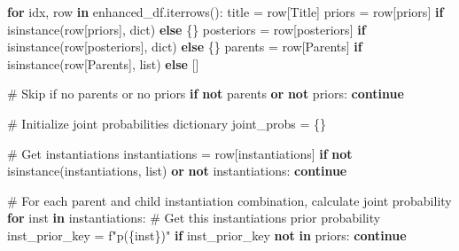 \documentclass[
  11pt,
  letterpaper,
]{book}
\newenvironment{Shaded}{\begin{snugshade}}{\end{snugshade}}
\newcommand{\BuiltInTok}[1]{\textcolor[rgb]{0.00,0.23,0.31}{#1}}
\newcommand{\CommentTok}[1]{\textcolor[rgb]{0.37,0.37,0.37}{#1}}
\newcommand{\ControlFlowTok}[1]{\textcolor[rgb]{0.00,0.23,0.31}{\textbf{#1}}}
\newcommand{\KeywordTok}[1]{\textcolor[rgb]{0.00,0.23,0.31}{\textbf{#1}}}
\newcommand{\NormalTok}[1]{\textcolor[rgb]{0.00,0.23,0.31}{#1}}
\newcommand{\OperatorTok}[1]{\textcolor[rgb]{0.37,0.37,0.37}{#1}}
\newcommand{\SpecialCharTok}[1]{\textcolor[rgb]{0.37,0.37,0.37}{#1}}
\newcommand{\SpecialStringTok}[1]{\textcolor[rgb]{0.13,0.47,0.30}{#1}}
\newcommand{\StringTok}[1]{\textcolor[rgb]{0.13,0.47,0.30}{#1}}
\begin{document}
\begin{Shaded}
\begin{Highlighting}[]
    \ControlFlowTok{for}\NormalTok{ idx, row }\KeywordTok{in}\NormalTok{ enhanced\_df.iterrows():}
\NormalTok{        title }\OperatorTok{=}\NormalTok{ row[}\StringTok{\textquotesingle{}Title\textquotesingle{}}\NormalTok{]}
\NormalTok{        priors }\OperatorTok{=}\NormalTok{ row[}\StringTok{\textquotesingle{}priors\textquotesingle{}}\NormalTok{] }\ControlFlowTok{if} \BuiltInTok{isinstance}\NormalTok{(row[}\StringTok{\textquotesingle{}priors\textquotesingle{}}\NormalTok{], }\BuiltInTok{dict}\NormalTok{) }\ControlFlowTok{else}\NormalTok{ \{\}}
\NormalTok{        posteriors }\OperatorTok{=}\NormalTok{ row[}\StringTok{\textquotesingle{}posteriors\textquotesingle{}}\NormalTok{] }\ControlFlowTok{if} \BuiltInTok{isinstance}\NormalTok{(row[}\StringTok{\textquotesingle{}posteriors\textquotesingle{}}\NormalTok{], }\BuiltInTok{dict}\NormalTok{) }\ControlFlowTok{else}\NormalTok{ \{\}}
\NormalTok{        parents }\OperatorTok{=}\NormalTok{ row[}\StringTok{\textquotesingle{}Parents\textquotesingle{}}\NormalTok{] }\ControlFlowTok{if} \BuiltInTok{isinstance}\NormalTok{(row[}\StringTok{\textquotesingle{}Parents\textquotesingle{}}\NormalTok{], }\BuiltInTok{list}\NormalTok{) }\ControlFlowTok{else}\NormalTok{ []}

        \CommentTok{\# Skip if no parents or no priors}
        \ControlFlowTok{if} \KeywordTok{not}\NormalTok{ parents }\KeywordTok{or} \KeywordTok{not}\NormalTok{ priors:}
            \ControlFlowTok{continue}

        \CommentTok{\# Initialize joint probabilities dictionary}
\NormalTok{        joint\_probs }\OperatorTok{=}\NormalTok{ \{\}}

        \CommentTok{\# Get instantiations}
\NormalTok{        instantiations }\OperatorTok{=}\NormalTok{ row[}\StringTok{\textquotesingle{}instantiations\textquotesingle{}}\NormalTok{]}
        \ControlFlowTok{if} \KeywordTok{not} \BuiltInTok{isinstance}\NormalTok{(instantiations, }\BuiltInTok{list}\NormalTok{) }\KeywordTok{or} \KeywordTok{not}\NormalTok{ instantiations:}
            \ControlFlowTok{continue}

        \CommentTok{\# For each parent and child instantiation combination, calculate joint probability}
        \ControlFlowTok{for}\NormalTok{ inst }\KeywordTok{in}\NormalTok{ instantiations:}
            \CommentTok{\# Get this instantiation\textquotesingle{}s prior probability}
\NormalTok{            inst\_prior\_key }\OperatorTok{=} \SpecialStringTok{f"p(}\SpecialCharTok{\{}\NormalTok{inst}\SpecialCharTok{\}}\SpecialStringTok{)"}
            \ControlFlowTok{if}\NormalTok{ inst\_prior\_key }\KeywordTok{not} \KeywordTok{in}\NormalTok{ priors:}
                \ControlFlowTok{continue}


\end{Highlighting}
\end{Shaded}
\end{document}

